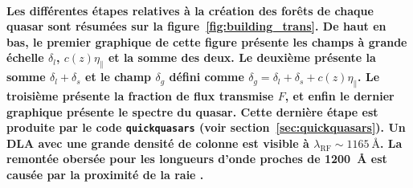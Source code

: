 \paragraph{}
\textbf{
  Les différentes étapes relatives à la création des forêts de chaque quasar sont résumées sur la figure~\ref{fig:building_trans}. De haut en bas, le premier graphique de cette figure présente les champs à grande échelle $\delta_l$, $c(z)\eta_{\parallel}$ et la somme des deux. Le deuxième présente la somme $\delta_l + \delta_s$ et le champ $\delta_g$ défini comme $\delta_g = \delta_l + \delta_s + c(z) \eta_{\parallel}$. Le troisième présente la fraction de flux transmise $F$, et enfin le dernier graphique présente le spectre du quasar. Cette dernière étape est produite par le code \texttt{quickquasars} (voir section~\ref{sec:quickquasars}). Un DLA avec une grande densité de colonne est visible à $\lambda_{\mathrm{RF}} \sim \SI{1165}{\angstrom}$. La remontée obersée pour les longueurs d'onde proches de \SI{1200}{\angstrom} est causée par la proximité de la raie \lya{}.
}
  

